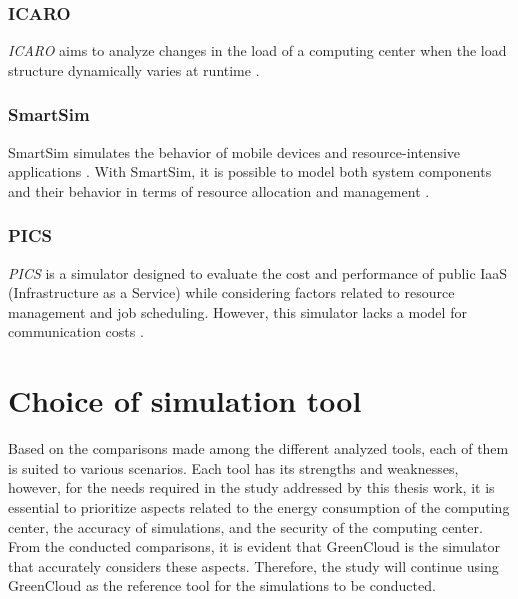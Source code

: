 {\subsubsection{ICARO}
\emph{ICARO} \cite{badii2016icaro} aims to analyze changes in the load of a computing center when the load structure dynamically varies at runtime \cite{khalil2017cloud}.

\subsubsection{SmartSim}
SmartSim \cite{shiraz2012extendable} simulates the behavior of mobile devices and resource-intensive applications \cite{khalil2017cloud}. With SmartSim, it is possible to model both system components and their behavior in terms of resource allocation and management \cite{suryateja2016comparative}.

\subsubsection{PICS}
\emph{PICS} \cite{kim2015pics} is a simulator designed to evaluate the cost and performance of public IaaS (Infrastructure as a Service) while considering factors related to resource management and job scheduling. However, this simulator lacks a model for communication costs \cite{suryateja2016comparative}.


\section{Choice of simulation tool}
Based on the comparisons made among the different analyzed tools, each of them is suited to various scenarios. Each tool has its strengths and weaknesses, however, for the needs required in the study addressed by this thesis work, it is essential to prioritize aspects related to the energy consumption of the computing center, the accuracy of simulations, and the security of the computing center. From the conducted comparisons, it is evident that GreenCloud is the simulator that accurately considers these aspects. Therefore, the study will continue using GreenCloud as the reference tool for the simulations to be conducted.

\section{}

}

